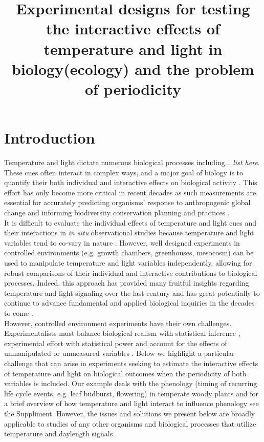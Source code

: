 \documentclass[11pt]{article}
\title{Experimental designs for testing the interactive effects of temperature and light in biology(ecology) and the problem of periodicity }
\begin{document}
\maketitle
\section{Introduction}
Temperature and light dictate numerous biological processes including....\textit{list here}\citep{}. These cues often interact in complex ways, and a major goal of biology is to quantify their both individual and interactive effects on biological activity \citep{}. This effort has only become more critical in recent decades as such measurements are essential for accurately predicting organisms' response to anthropogenic global change and informing biodiversity conservation planning and practices \citep{}.\\

It is difficult to evaluate the individual effects of temperature and light cues and their interactions in \textit{in situ} observational studies because temperature and light variables tend to co-vary in nature \citep{}. However, well designed experiments in controlled environments (e.g. growth chambers, greenhouses, mesocosm) can be used to manipulate temperature and light variables independently, allowing for robust comparisons of their individual and interactive contributions to biological processes. Indeed, this approach has provided many fruitful insights regarding temperature and light signaling over the last century \citep{} and has great potentially to continue to advance fundamental and applied biological inquiries in the decades to come \citep{}.\\

However, controlled environment experiments have their own challenges. Experimentalists must balance biological realism with statistical inference \citep{}, experimental effort with statistical power \citep{} and account for the effects of unmanipulated or unmeasured variables \citep{}. Below we highlight a particular challenge that can arise in experiments seeking to estimate the interactive effects of temperature and light on biological outcomes when the periodicity of both variables is included. Our example deals with the phenology (timing of recurring life cycle events, e.g. leaf budburst, flowering) in temperate woody plants and for a brief overview of how temperature and light interact to influence phenology see the Suppliment. However, the issues and solutions we present below are broadly applicable to studies of any other organisms and biological processes that utilize temperature and daylength signals \citep{}. \\
\end{document}
